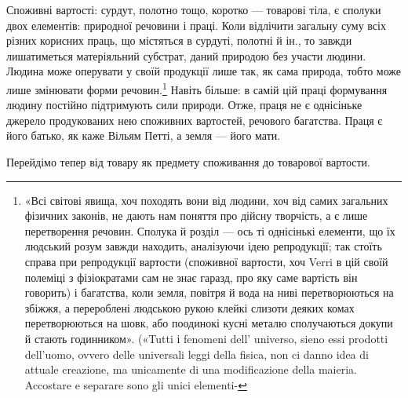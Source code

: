 Споживні вартості: сурдут, полотно тощо, коротко — товарові
тіла, є сполуки двох елементів: природної речовини і праці. Коли
відлічити загальну суму всіх різних корисних праць, що містяться
в сурдуті, полотні й ін., то завжди лишатиметься матеріяльний
субстрат, даний природою без участи людини. Людина може оперувати
у своїй продукції лише так, як сама природа, тобто може
лише змінювати форми речовин.\footnote{
«Всі світові явища, хоч походять вони від людини, хоч від самих
загальних фізичних законів, не дають нам поняття про дійсну творчість,
а є лише перетворення речовин. Сполука й розділ — ось ті однісінькі
елементи, що їх людський розум завжди находить, аналізуючи ідею репродукції;
так стоїть справа при репродукції вартости (споживної вартости,
хоч Verri в цій своїй полеміці з фізіократами сам не знає гаразд, про яку
саме вартість він говорить) і багатства, коли земля, повітря й вода на
ниві перетворюються на збіжжя, а перероблені людською рукою клейкі
слизоти деяких комах перетворюються на шовк, або поодинокі кусні
металю сполучаються докупи й стають годинником». («Tutti і fenomeni
dell' universo, sieno essi prodotti dell’uomo, ovvero delle universali leggi
della fisica, non ci danno idea di attuale creazione, ma unicamente di una
modificazione della maieria. Accostare e separare sono gli unici elementi-
} Навіть більше: в самій цій праці
формування людину постійно підтримують сили природи. Отже,
праця не є однісіньке джерело продукованих нею споживних вартостей,
речового багатства. Праця є його батько, як каже Вільям
Петті, а земля — його мати.

Перейдімо тепер від товару як предмету споживання до товарової
вартости.

